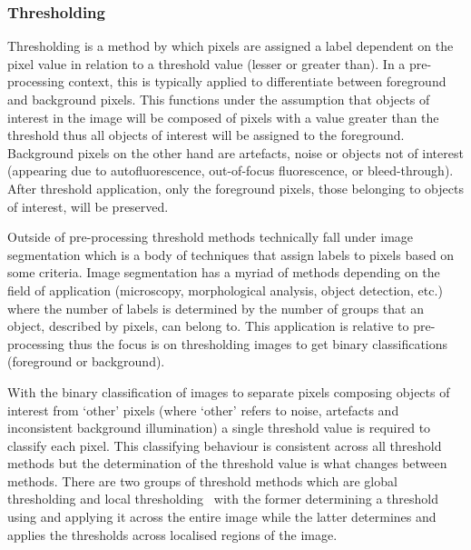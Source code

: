 \subsubsection{Thresholding}\label{subsec:thresholding}
Thresholding is a method by which pixels are assigned a label dependent on the pixel value in relation to a threshold value (lesser or greater than). In a pre-processing context, this is typically applied to differentiate between foreground and background pixels. This functions under the assumption that objects of interest in the image will be composed of pixels with a value greater than the threshold thus all objects of interest will be assigned to the foreground. Background pixels on the other hand are artefacts, noise or objects not of interest (appearing due to autofluorescence, out-of-focus fluorescence, or bleed-through). After threshold application, only the foreground pixels, those belonging to objects of interest, will be preserved.\par Outside of pre-processing threshold methods technically fall under image segmentation which is a body of techniques that assign labels to pixels based on some criteria. Image segmentation has a myriad of methods depending on the field of application (microscopy, morphological analysis, object detection, etc.) where the number of labels is determined by the number of groups that an object, described by pixels, can belong to. This application is relative to pre-processing thus the focus is on thresholding images to get binary classifications (foreground or background).\par With the binary classification of images to separate pixels composing objects of interest from `other' pixels (where `other' refers to noise, artefacts and inconsistent background illumination) a single threshold value is required to classify each pixel. This classifying behaviour is consistent across all threshold methods but the determination of the threshold value is what changes between methods. There are two groups of threshold methods which are global thresholding and local thresholding~\cite{segmentation_book} with the former determining a threshold using and applying it across the entire image while the latter determines and applies the thresholds across localised regions of the image.
